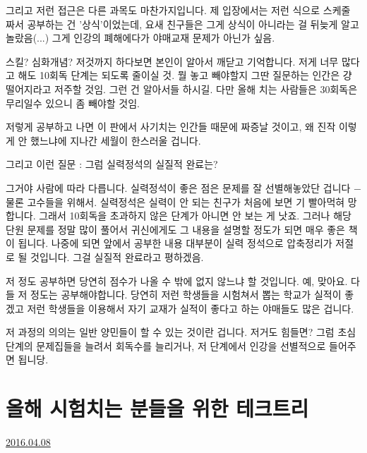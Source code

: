 그리고 저런 접근은 다른 과목도 마찬가지입니다.
제 입장에서는 저런 식으로 스케줄 짜서 공부하는 건 '상식'이었는데, 요새 친구들은 그게 상식이 아니라는 걸 뒤늦게 알고 놀랐음(...)
그게 인강의 폐해에다가 야매교재 문제가 아닌가 싶음.
\vspace{5mm}

스킬? 심화개념?
저것까지 하다보면 본인이 알아서 깨닫고 기억합니다.
저게 너무 많다고 해도 10회독 단계는 되도록 줄이실 것. 뭘 놓고 빼야할지 그딴 질문하는 인간은 걍 떨어지라고 저주할 것임.
그런 건 알아서들 하시길. 다만 올해 치는 사람들은 30회독은 무리일수 있으니 좀 빼야할 것임.
\vspace{5mm}

저렇게 공부하고 나면 이 판에서 사기치는 인간들 때문에 짜증날 것이고, 왜 진작 이렇게 안 했느냐에 지나간 세월이 한스러울 겁니다.
\vspace{5mm}

그리고 이런 질문 : 그럼 실력정석의 실질적 완료는?
\vspace{5mm}

그거야 사람에 따라 다릅니다. 실력정석이 좋은 점은 문제를 잘 선별해놓았단 겁니다 $-$ 물론 고수들을 위해서.
실력정석은 실력이 안 되는 친구가 처음에 보면 기 빨아먹혀 망합니다. 그래서 10회독을 초과하지 않은 단계가 아니면 안 보는 게 낫죠.
그러나 해당 단원 문제를 정말 많이 풀어서 귀신에게도 그 내용을 설명할 정도가 되면 매우 좋은 책이 됩니다.
나중에 되면 앞에서 공부한 내용 대부분이 실력 정석으로 압축정리가 저절로 될 것입니다. 그걸 실질적 완료라고 평하겠음.
\vspace{5mm}

저 정도 공부하면 당연히 점수가 나올 수 밖에 없지 않느냐 할 것입니다. 예, 맞아요. 다들 저 정도는 공부해야합니다.
당연히 저런 학생들을 시험쳐서 뽑는 학교가 실적이 좋겠고
저런 학생들을 이용해서 자기 교재가 실적이 좋다고 하는 야매들도 많은 겁니다.
\vspace{5mm}

저 과정의 의의는 일반 양민들이 할 수 있는 것이란 겁니다. 저거도 힘들면?
그럼 초심 단계의 문제집들을 늘려서 회독수를 늘리거나, 저 단계에서 인강을 선별적으로 들어주면 됩니당.
\vspace{5mm}






\section{올해 시험치는 분들을 위한 테크트리}
\href{https://www.kockoc.com/Apoc/719082}{2016.04.08}

\vspace{5mm}

